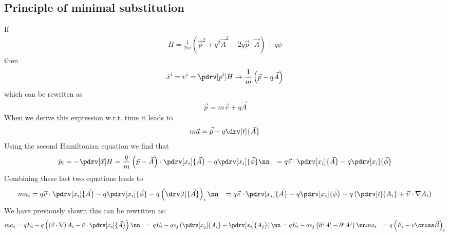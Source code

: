    \subsection{Principle of minimal substitution}
   If
   \begin{align}
     H = \frac{1}{2m}\left(\vec p^2+q^2\vec A^2-2q\vec p \cdot \vec A\right)+q\phi
   \end{align}
    then
    \begin{align}
      \dot x^i = v^i = \pdrv[p^i]H \to \frac{1}{m}\left(\vec p -q\vec A\right)
    \end{align}
    which can be rewriten as
   \begin{align}
     \vec p = m \vec v + q \vec A
   \end{align}
    When we derive this expression w.r.t. time it leads to
  \begin{align}
     m\vec a = \vec{{\dot p}}-q\drv[t]{\vec A}
  \end{align}
    Using the second Hamiltonian equation we find that
    \begin{align}
      {\dot p}_i = -\pdrv[\vec x]H &= \frac{q}{m}\left(\vec p -\vec A\right)\cdot \pdrv[x_i]{\vec A} - q\pdrv[x_i]{\vec \phi}\nn
      &= q\vec v\cdot \pdrv[x_i]{\vec A} - q\pdrv[x_i]{\vec \phi}
    \end{align}
    Combining these last two equations leads to
    \begin{align}
      m a_i &= q\vec v\cdot \pdrv[x_i]{\vec A} - q\pdrv[x_i]{\vec \phi}-q\left(\drv[t]{\vec A}\right)_i\nn
      &=q\vec v\cdot \pdrv[x_i]{\vec A} - q\pdrv[x_i]{\vec \phi}-q\left(\pdrv[t]{A_i} + \vec v\cdot\nabla A_i\right)
    \end{align}
    We have previously shown this can be rewritten as:
    \begin{align}
      ma_i &= qE_i -q \left(\left(\vec v\cdot\nabla\right)A_i-\vec v\cdot\pdrv[x_i]{\vec A}\right)\nn
      &= qE_i -q v_j\left(\pdrv[x_j]{A_i} - \pdrv[x_i]{A_j}\right)\nn
      &= qE_i -q v_j\left(\partial^j A^i - \partial^i A^j\right)\nn
      ma_i &= q\left(E_i - v \cross \vec B\right)_i
    \end{align}

